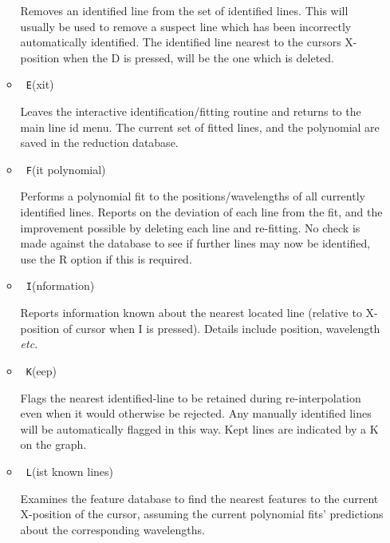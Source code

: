 \documentclass[twoside,11pt]{article}
\renewcommand{\_}{\texttt{\symbol{95}}}
\newcommand{\sunspec}[2]{#1}
\newcommand{\myindex}[1]{\index{#1}}
\newcommand{\sunspec}[2]{#2}
\newcommand{\myindex}[1]{}
\begin{document}
\begin{itemize}
\begin{itemize}
            Removes an identified line from
            the set of identified lines. This will usually be used to
            remove a suspect line which has been incorrectly automatically
            identified. The identified line nearest to the cursors
            X-position when the D is pressed,  will be the one which is
            deleted.

      \item {\sunspec{\Large\tt}{\bf} E}(xit)

            Leaves the interactive
            identification/fitting routine and returns to the main line id
            menu. The current set of fitted lines,  and the polynomial are
            saved in the reduction database.

      \item {\sunspec{\Large\tt}{\bf} F}(it polynomial)

            Performs a polynomial fit to
            the positions/wavelengths of all currently identified lines.
            Reports on the deviation of each line from the fit,  and the
            improvement possible by deleting each line and re-fitting. No
            check is made against the database to see if further lines may
            now be identified, use the R option if this is required.

      \item {\sunspec{\Large\tt}{\bf} I}(nformation)

            Reports information known about
            the nearest located line (relative to X-position of cursor when
            I is pressed). Details include position, wavelength {\it etc.}

      \item {\sunspec{\Large\tt}{\bf} K}(eep)

            Flags the nearest identified-line to
            be retained during re-interpolation even when it
            would otherwise be rejected. Any manually identified lines will
            be automatically flagged in this way. Kept lines are indicated
            by a K on the graph.

      \item {\sunspec{\Large\tt}{\bf} L}(ist known lines)
            \myindex{Arc fitting!list known lines}

            Examines the feature database
            to find the nearest features to the current X-position of the
            cursor,  assuming the current polynomial fits' predictions
            about the corresponding wavelengths.


\end{itemize}
\end{itemize}
\end{document}
